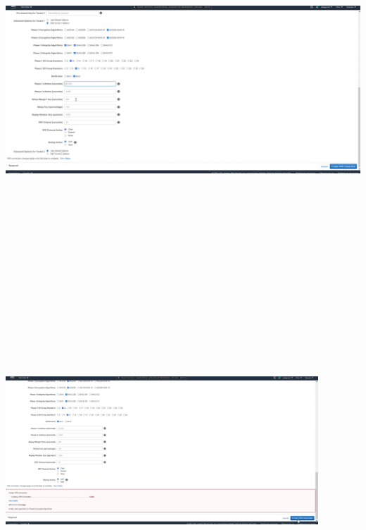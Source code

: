 \documentclass{article} %
\begin{document}
\noindent \includegraphics*[width=5.71in, height=6.32in, trim=0.00in 0.25in 8.16in 0.00in]{image23}

\noindent 

\noindent 

\noindent \includegraphics*[width=4.63in, height=3.96in, trim=0.00in 1.49in 6.56in 0.00in]{image24}
\end{document}
